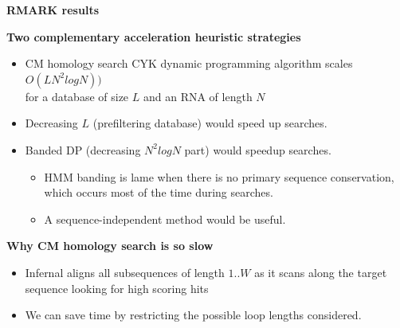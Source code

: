 \documentclass[landscape]{slides}
\begin{document}
\begin{slide}
\begin{center}
\large
\textbf{RMARK results}
\end{center}
\medskip


\vfill 
\end{slide}


\begin{slide}
\begin{center}
\textbf{Two complementary acceleration heuristic strategies}
\end{center}

\medskip
\small
\begin{itemize}

\item
CM homology search CYK dynamic programming algorithm scales $O(LN^2 log N))$ \\ 
for a database of size $L$ and an RNA of length $N$ 

\item 
Decreasing $L$ (prefiltering database) would speed up searches.

\item 
Banded DP (decreasing $N^2 logN$ part) would speedup searches.

\begin{itemize}
\item 
  HMM banding is lame when there is no primary sequence conservation, \\ which occurs most of the time during searches. 
\item 
  A sequence-independent method would be useful.
\end{itemize}
\end{itemize}

\vfill
\end{slide}
\begin{slide}
\begin{center}
\textbf{Why CM homology search is so slow}
\end{center}

\medskip
\small
\begin{itemize}

\item
Infernal aligns all subsequences of length $1..W$ as it scans along the target sequence
looking for high scoring hits
\end{itemize}


\begin{itemize}
\item
  We can save time by restricting the possible loop lengths
  considered.
\end{itemize}

\vfill
\end{slide}
\end{document}

